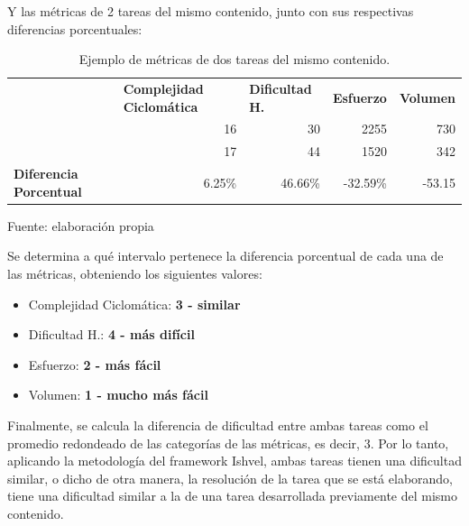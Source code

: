 \documentclass[letterpaper,12pt]{article}
\begin{document}
Y las métricas de 2 tareas del mismo contenido, junto con sus respectivas diferencias porcentuales:

\begin{table}[H]
  \centering
  \begin{tabular}{l|r|r|r|r|}
    \cline{2-5}
                                                         & \multicolumn{1}{l|}{\textbf{Complejidad Ciclomática}} & \multicolumn{1}{l|}{\textbf{Dificultad H.}} & \multicolumn{1}{l|}{\textbf{Esfuerzo}} & \multicolumn{1}{l|}{\textbf{Volumen}} \\ \cline{2-5}
                                                         & 16                                                    & 30                                          & 2255                                   & 730                                   \\ \cline{2-5}
                                                         & 17                                                    & 44                                          & 1520                                   & 342                                   \\ \hline
    \multicolumn{1}{|l|}{\textbf{Diferencia Porcentual}} & 6.25\%                                                & 46.66\%                                     & -32.59\%                               & -53.15                                \\ \hline
  \end{tabular}
  \caption{Ejemplo de métricas de dos tareas del mismo contenido.} Fuente: elaboración propia
  \label{tab:example-metrics-two-homeworks}
\end{table}

Se determina a qué intervalo pertenece la diferencia porcentual de cada una de las métricas, obteniendo los siguientes valores:

\begin{itemize}
  \item Complejidad Ciclomática: \textbf{3 - similar}
  \item Dificultad H.: \textbf{4 - más difícil}
  \item Esfuerzo: \textbf{2 - más fácil}
  \item Volumen: \textbf{1 - mucho más fácil}
\end{itemize}

Finalmente, se calcula la diferencia de dificultad entre ambas tareas como el promedio redondeado de las categorías de las métricas, es decir, 3. Por lo tanto, aplicando la metodología del framework Ishvel, ambas tareas tienen una dificultad similar, o dicho de otra manera, la resolución de la tarea que se está elaborando, tiene una dificultad similar a la de una tarea desarrollada previamente del mismo contenido.
\end{document}
